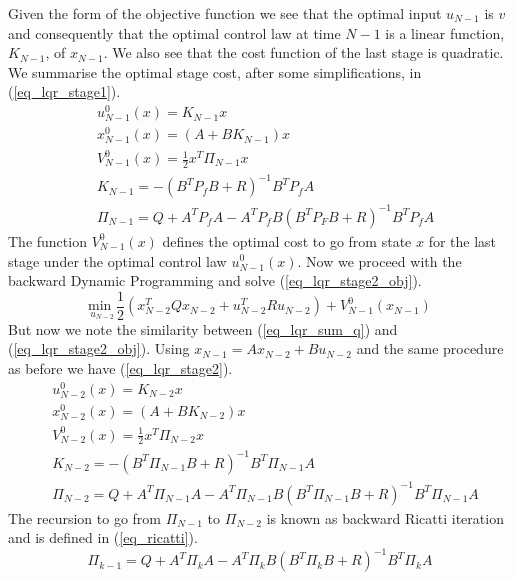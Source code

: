 \documentclass[../masters.tex]{subfiles}
\begin{document}
Given the form of the objective function we see that the optimal input $u_{N-1}$ is $v$ and consequently that the optimal control law at time $N-1$ is a linear function, $K_{N-1}$, of $x_{N-1}$. We also see that the cost function of the last stage is quadratic. We summarise the optimal stage cost, after some simplifications, in (\ref{eq_lqr_stage1}).
\begin{equation}
\begin{aligned}
&u^0_{N-1}(x) = K_{N-1}x \\
&x^0_{N-1}(x) = (A+BK_{N-1})x \\
&V^0_{N-1}(x) = \frac{1}{2}x^T\Pi_{N-1}x \\
&K_{N-1} = -(B^TP_fB+R)^{-1}B^TP_fA \\
&\Pi_{N-1} = Q + A^TP_fA-A^TP_fB(B^TP_FB+R)^{-1}B^TP_fA 
\end{aligned}
\label{eq_lqr_stage1}
\end{equation} 
The function $V^0_{N-1}(x)$ defines the optimal cost to go from state $x$ for the last stage under the optimal control law $u^0_{N-1}(x)$. Now we proceed with the backward Dynamic Programming and solve (\ref{eq_lqr_stage2_obj}).
\begin{equation}
\underset{u_{N-2}}{\text{min }}  \frac{1}{2}\left(x_{N-2}^TQx_{N-2} + u_{N-2}^TRu_{N-2} \right) + V^0_{N-1}(x_{N-1})
\label{eq_lqr_stage2_obj}
\end{equation}
But now we note the similarity between (\ref{eq_lqr_sum_q}) and (\ref{eq_lqr_stage2_obj}). Using $x_{N-1}=Ax_{N-2}+Bu_{N-2}$ and the same procedure as before we have (\ref{eq_lqr_stage2}). 
\begin{equation}
\begin{aligned}
&u^0_{N-2}(x) = K_{N-2}x \\
&x^0_{N-2}(x) = (A+BK_{N-2})x \\
&V^0_{N-2}(x) = \frac{1}{2}x^T\Pi_{N-2}x \\
&K_{N-2} = -(B^T\Pi_{N-1}B+R)^{-1}B^T\Pi_{N-1}A \\
&\Pi_{N-2} = Q + A^T\Pi_{N-1}A-A^T\Pi_{N-1}B(B^T\Pi_{N-1}B+R)^{-1}B^T\Pi_{N-1}A 
\end{aligned}
\label{eq_lqr_stage2}
\end{equation} 
The recursion to go from $\Pi_{N-1}$ to $\Pi_{N-2}$ is known as backward Ricatti iteration and is defined in (\ref{eq_ricatti}).
\begin{equation}
\Pi_{k-1} = Q + A^T\Pi_{k}A-A^T\Pi_{k}B(B^T\Pi_{k}B+R)^{-1}B^T\Pi_{k}A  
\label{eq_ricatti}
\end{equation}
\end{document}

